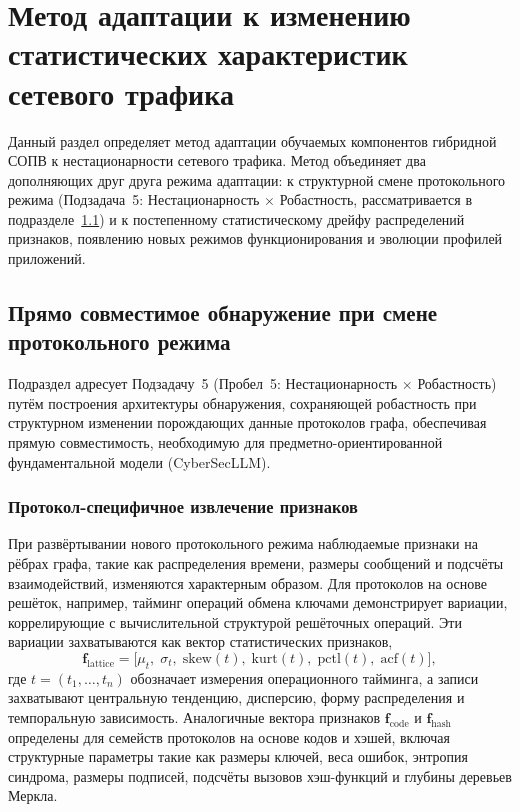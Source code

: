 \section{Метод адаптации к изменению статистических характеристик сетевого трафика}
\label{sec:drift_adaptation}

Данный раздел определяет метод адаптации обучаемых компонентов гибридной СОПВ к нестационарности сетевого трафика. Метод объединяет два дополняющих друг друга режима адаптации: к структурной смене протокольного режима (Подзадача~5: Нестационарность $\times$ Робастность, рассматривается в подразделе~\ref{sec:pq_idps}) и к постепенному статистическому дрейфу распределений признаков, появлению новых режимов функционирования и эволюции профилей приложений.

\subsection{Прямо совместимое обнаружение при смене протокольного режима}
\label{sec:pq_idps}

Подраздел адресует Подзадачу~5 (Пробел~5: Нестационарность $\times$ Робастность) путём построения архитектуры обнаружения, сохраняющей робастность при структурном изменении порождающих данные протоколов графа, обеспечивая прямую совместимость, необходимую для предметно-ориентированной фундаментальной модели (CyberSecLLM).

\subsubsection{Протокол-специфичное извлечение признаков}

При развёртывании нового протокольного режима наблюдаемые признаки на рёбрах графа, такие как распределения времени, размеры сообщений и подсчёты взаимодействий, изменяются характерным образом. Для протоколов на основе решёток, например, тайминг операций обмена ключами демонстрирует вариации, коррелирующие с вычислительной структурой решёточных операций. Эти вариации захватываются как вектор статистических признаков,
\begin{equation}
\mathbf{f}_{\mathrm{lattice}}
= \bigl[\mu_t,\;\sigma_t,\;\mathrm{skew}(t),\;\mathrm{kurt}(t),\;
  \mathrm{pctl}(t),\;\mathrm{acf}(t)\bigr],
\label{eq:pq_feat_lattice}
\end{equation}
где $t=(t_1,\dots,t_n)$ обозначает измерения операционного тайминга, а записи захватывают центральную тенденцию, дисперсию, форму распределения и темпоральную зависимость. Аналогичные вектора признаков $\mathbf{f}_{\mathrm{code}}$ и $\mathbf{f}_{\mathrm{hash}}$ определены для семейств протоколов на основе кодов и хэшей, включая структурные параметры такие как размеры ключей, веса ошибок, энтропия синдрома, размеры подписей, подсчёты вызовов хэш-функций и глубины деревьев Меркла.


